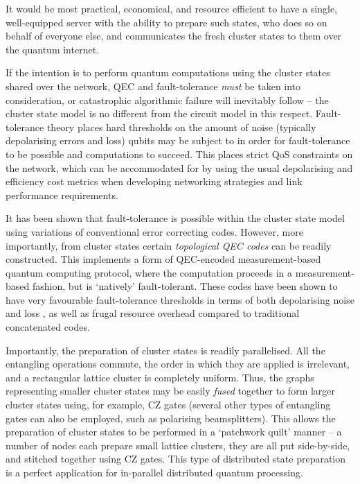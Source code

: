 \documentclass[aps,rmp,twocolumn,amsmath,amssymb,nofootinbib,superscriptaddress,longbibliography,floatfix]{revtex4-1}
\begin{document}
It would be most practical, economical, and resource efficient to have a single, well-equipped server with the ability to prepare such states, who does so on behalf of everyone else, and communicates the fresh cluster states to them over the quantum internet.

If the intention is to perform quantum computations using the cluster states shared over the network, QEC and fault-tolerance \emph{must} be taken into consideration, or catastrophic algorithmic failure will inevitably follow -- the cluster state model is no different from the circuit model in this respect. Fault-tolerance theory places hard thresholds on the amount of noise (typically depolarising errors and loss) qubits may be subject to in order for fault-tolerance to be possible and computations to succeed. This places strict QoS constraints on the network, which can be accommodated for by using the usual depolarising and efficiency cost metrics when developing networking strategies and link performance requirements.

It has been shown that fault-tolerance is possible within the cluster state model \cite{bib:NielsenDawson04, bib:Dawson06} using variations of conventional error correcting codes. However, more importantly, from cluster states certain \emph{topological QEC codes} \cite{???} can be readily constructed. This implements a form of QEC-encoded measurement-based quantum computing protocol, where the computation proceeds in a measurement-based fashion, but is `natively' fault-tolerant. These codes have been shown to have very favourable fault-tolerance thresholds in terms of both depolarising noise and loss \cite{bib:StaceBarrettDohertyLoss, bib:BarrettStaceFT}, as well as frugal resource overhead compared to traditional concatenated codes.

Importantly, the preparation of cluster states is readily parallelised. All the entangling operations commute, the order in which they are applied is irrelevant, and a rectangular lattice cluster is completely uniform. Thus, the graphs representing smaller cluster states may be easily \emph{fused} together to form larger cluster states using, for example, CZ gates (several other types of entangling gates can also be employed, such as polarising beamsplitters). This allows the preparation of cluster states to be performed in a `patchwork quilt' manner -- a number of nodes each prepare small lattice clusters, they are all put side-by-side, and stitched together using CZ gates. This type of distributed state preparation is a perfect application for in-parallel distributed quantum processing.
\end{document}
